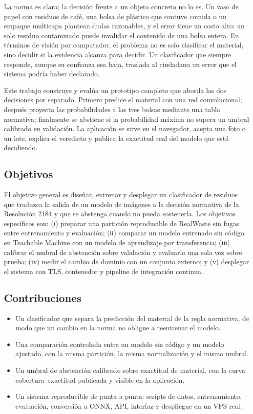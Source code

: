 \documentclass[10pt]{ieeeconf}
\begin{document}
La norma es clara; la decisi\'on frente a un objeto concreto no lo es. Un vaso de
papel con residuos de caf\'e, una bolsa de pl\'astico que contuvo comida o un
empaque multicapa plantean dudas razonables, y el error tiene un costo alto: un
solo residuo contaminado puede invalidar el contenido de una bolsa entera. En
t\'erminos de visi\'on por computador, el problema no es solo clasificar el
material, sino decidir si la evidencia alcanza para decidir. Un clasificador que
siempre responde, aunque su confianza sea baja, traslada al ciudadano un error
que el sistema podr\'ia haber declarado.

Este trabajo construye y eval\'ua un prototipo completo que aborda las dos
decisiones por separado. Primero predice el material con una red convolucional;
despu\'es proyecta las probabilidades a las tres bolsas mediante una tabla
normativa; finalmente se abstiene si la probabilidad m\'axima no supera un umbral
calibrado en validaci\'on. La aplicaci\'on se sirve en el navegador, acepta una
foto o un lote, explica el veredicto y publica la exactitud real del modelo que
est\'a decidiendo.

\subsection{Objetivos}

El objetivo general es dise\~nar, entrenar y desplegar un clasificador de residuos
que traduzca la salida de un modelo de im\'agenes a la decisi\'on normativa de la
Resoluci\'on 2184 y que se abstenga cuando no pueda sostenerla. Los objetivos
espec\'ificos son: (i) preparar una partici\'on reproducible de RealWaste sin
fugas entre entrenamiento y evaluaci\'on; (ii) comparar un modelo entrenado sin
c\'odigo en Teachable Machine con un modelo de aprendizaje por transferencia;
(iii) calibrar el umbral de abstenci\'on sobre validaci\'on y evaluarlo una sola
vez sobre prueba; (iv) medir el cambio de dominio con un conjunto externo; y (v)
desplegar el sistema con TLS, contenedor y pipeline de integraci\'on continua.

\subsection{Contribuciones}

\begin{itemize}
\item Un clasificador que separa la predicci\'on del material de la regla
normativa, de modo que un cambio en la norma no obligue a reentrenar el modelo.
\item Una comparaci\'on controlada entre un modelo sin c\'odigo y un modelo
ajustado, con la misma partici\'on, la misma normalizaci\'on y el mismo umbral.
\item Un umbral de abstenci\'on calibrado sobre exactitud de material, con la
curva cobertura--exactitud publicada y visible en la aplicaci\'on.
\item Un sistema reproducible de punta a punta: scripts de datos, entrenamiento,
evaluaci\'on, conversi\'on a ONNX, API, interfaz y despliegue en un VPS real.
\end{itemize}
\end{document}
